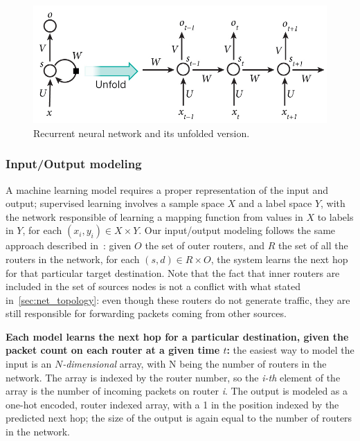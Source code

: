 \begin{figure}
\centering
\includegraphics[width=\textwidth]{img/rnn}
\caption{Recurrent neural network and its unfolded version.\protect\footnotemark }
\label{fig:rnn}
\end{figure}

\subsubsection{Input/Output modeling}
A machine learning model requires a proper representation of the input and output; supervised learning involves a sample space $X$ and a label space $Y$, with the network responsible of learning a mapping function from values in $X$ to labels in $Y$, for each $(x_i, y_i) \in X\times Y$. Our input/output modeling follows the same approach described in~\cite{Kato}: given $O$ the set of outer routers, and $R$ the set of all the routers in the network, for each $(s, d) \in R \times O$, the system learns the next hop for that particular target destination. Note that the fact that inner routers are included in the set of sources nodes is not a conflict with what stated in~\ref{sec:net_topology}: even though these routers do not generate traffic, they are still responsible for forwarding packets coming from other sources.

{\bf Each model learns the next hop for a particular destination, given the packet count on each router at a given time $t$: } the easiest way to model the input is an $N$\textit{-dimensional} array, with N being the number of routers in the network. The array is indexed by the router number, so the \textit{i-th} element of the array is the number of incoming packets on router \textit{i}. The output is modeled as a one-hot encoded, router indexed array, with a 1 in the position indexed by the predicted next hop; the size of the output is again equal to the number of routers in the network.

